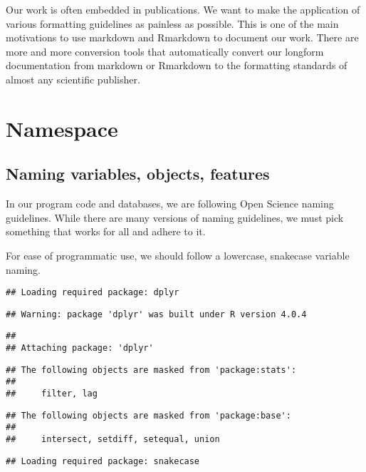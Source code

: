 \documentclass[
  fontsize=13pt,
  english,
  a4paper,
  openany, a4paper, oneside]{book}
\begin{document}
Our work is often embedded in publications. We want to make the application of various formatting guidelines as painless as possible. This is one of the main motivations to use markdown and Rmarkdown to document our work. There are more and more conversion tools that automatically convert our longform documentation from markdown or Rmarkdown to the formatting standards of almost any scientific publisher.

\hypertarget{namespace}{%
\section{Namespace}\label{namespace}}

\hypertarget{naming-variables-objects-features}{%
\subsection{Naming variables, objects, features}\label{naming-variables-objects-features}}

In our program code and databases, we are following Open Science naming guidelines. While there are many versions of naming guidelines, we must pick something that works for all and adhere to it.

For ease of programmatic use, we should follow a lowercase, snakecase variable naming.

\begin{verbatim}
## Loading required package: dplyr
\end{verbatim}

\begin{verbatim}
## Warning: package 'dplyr' was built under R version 4.0.4
\end{verbatim}

\begin{verbatim}
## 
## Attaching package: 'dplyr'
\end{verbatim}

\begin{verbatim}
## The following objects are masked from 'package:stats':
## 
##     filter, lag
\end{verbatim}

\begin{verbatim}
## The following objects are masked from 'package:base':
## 
##     intersect, setdiff, setequal, union
\end{verbatim}

\begin{verbatim}
## Loading required package: snakecase
\end{verbatim}
\end{document}
